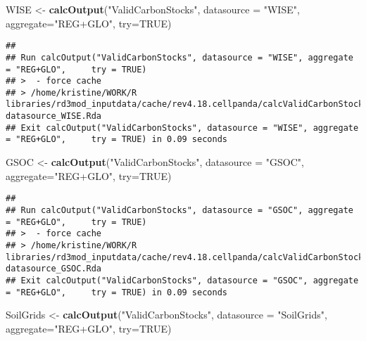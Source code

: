 \documentclass[
]{article}
\newenvironment{Shaded}{\begin{snugshade}}{\end{snugshade}}
\newcommand{\DataTypeTok}[1]{\textcolor[rgb]{0.13,0.29,0.53}{#1}}
\newcommand{\KeywordTok}[1]{\textcolor[rgb]{0.13,0.29,0.53}{\textbf{#1}}}
\newcommand{\NormalTok}[1]{#1}
\newcommand{\OtherTok}[1]{\textcolor[rgb]{0.56,0.35,0.01}{#1}}
\newcommand{\StringTok}[1]{\textcolor[rgb]{0.31,0.60,0.02}{#1}}
\begin{document}
\begin{Shaded}
\begin{Highlighting}[]
\NormalTok{  WISE       <{-}}\StringTok{ }\KeywordTok{calcOutput}\NormalTok{(}\StringTok{"ValidCarbonStocks"}\NormalTok{, }\DataTypeTok{datasource =} \StringTok{"WISE"}\NormalTok{, }\DataTypeTok{aggregate=}\StringTok{"REG+GLO"}\NormalTok{, }\DataTypeTok{try=}\OtherTok{TRUE}\NormalTok{)}
\end{Highlighting}
\end{Shaded}

\begin{verbatim}
## 
## Run calcOutput("ValidCarbonStocks", datasource = "WISE", aggregate = "REG+GLO",     try = TRUE)
## >  - force cache 
## > /home/kristine/WORK/R libraries/rd3mod_inputdata/cache/rev4.18.cellpanda/calcValidCarbonStocks-datasource_WISE.Rda
## Exit calcOutput("ValidCarbonStocks", datasource = "WISE", aggregate = "REG+GLO",     try = TRUE) in 0.09 seconds
\end{verbatim}

\begin{Shaded}
\begin{Highlighting}[]
\NormalTok{  GSOC       <{-}}\StringTok{ }\KeywordTok{calcOutput}\NormalTok{(}\StringTok{"ValidCarbonStocks"}\NormalTok{, }\DataTypeTok{datasource =} \StringTok{"GSOC"}\NormalTok{, }\DataTypeTok{aggregate=}\StringTok{"REG+GLO"}\NormalTok{, }\DataTypeTok{try=}\OtherTok{TRUE}\NormalTok{)}
\end{Highlighting}
\end{Shaded}

\begin{verbatim}
## 
## Run calcOutput("ValidCarbonStocks", datasource = "GSOC", aggregate = "REG+GLO",     try = TRUE)
## >  - force cache 
## > /home/kristine/WORK/R libraries/rd3mod_inputdata/cache/rev4.18.cellpanda/calcValidCarbonStocks-datasource_GSOC.Rda
## Exit calcOutput("ValidCarbonStocks", datasource = "GSOC", aggregate = "REG+GLO",     try = TRUE) in 0.09 seconds
\end{verbatim}

\begin{Shaded}
\begin{Highlighting}[]
\NormalTok{  SoilGrids  <{-}}\StringTok{ }\KeywordTok{calcOutput}\NormalTok{(}\StringTok{"ValidCarbonStocks"}\NormalTok{, }\DataTypeTok{datasource =} \StringTok{"SoilGrids"}\NormalTok{, }\DataTypeTok{aggregate=}\StringTok{"REG+GLO"}\NormalTok{, }\DataTypeTok{try=}\OtherTok{TRUE}\NormalTok{)}
\end{Highlighting}
\end{Shaded}
\end{document}
